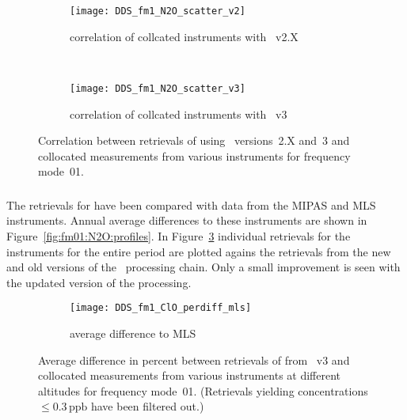\begin{figure}[htpb]
    \centering
    \begin{subfigure}[b]{0.49\textwidth}
        \texttt{[image: DDS\_fm1\_N2O\_scatter\_v2]}
        \caption{correlation of collcated instruments with \smr~v2.X}
        \label{fig:fm01:N2O:scatter:v2}
    \end{subfigure}
    \,
    \begin{subfigure}[b]{0.49\textwidth}
        \texttt{[image: DDS\_fm1\_N2O\_scatter\_v3]}
        \caption{correlation of collcated instruments with \smr~v3}
        \label{fig:fm01:N2O:scatter:v3}
    \end{subfigure}
    \caption{Correlation between retrievals of  using \smr\
    versions~2.X and~3 and collocated measurements from various instruments
    for frequency mode~01.}
    \label{fig:fm01:N2O:scatter}
\end{figure}

\subsubsection{}
\label{sec:fm01:comparison:N2O}
The retrievals for \chem{N_2O} have been compared with data from the MIPAS and
MLS instruments. Annual average differences to these instruments are shown in
Figure~\ref{fig:fm01:N2O:profiles}. In Figure~\ref{fig:fm01:N2O:scatter}
individual retrievals for the instruments for the entire period are plotted
agains the retrievals from the new and old versions of the \smr\ processing
chain. Only a small improvement is seen with the updated version of the
processing.



\begin{figure}[htpb]
    \centering
    \begin{subfigure}[b]{0.49\textwidth}
        \texttt{[image: DDS\_fm1\_ClO\_perdiff\_mls]}
        \caption{average difference to MLS}
        \label{fig:fm01:ClO:profiles:MLS}
    \end{subfigure}
    \caption{Average difference in percent between retrievals of 
    from \smr~v3 and collocated measurements from various instruments at
    different altitudes for frequency mode~01. (Retrievals yielding
    concentrations $\leq 0.3\,\mathrm{ppb}$ have been filtered out.)}
    \label{fig:fm01:ClO:profiles}
\end{figure}

